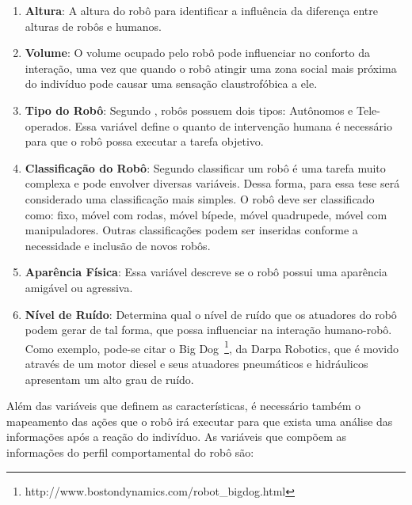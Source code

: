 \begin{enumerate}
	\item \textbf{Altura}: A altura do robô para identificar a influência da diferença entre alturas de robôs e humanos.
	\item \textbf{Volume}: O volume ocupado pelo robô pode influenciar no conforto da interação, uma vez que quando o robô atingir uma zona social mais próxima do indivíduo pode causar uma sensação claustrofóbica a ele.
	\item \textbf{Tipo do Robô}: Segundo , robôs possuem dois tipos: Autônomos e Tele-operados. Essa variável define o quanto de intervenção humana é necessário para que o robô possa executar a tarefa objetivo.
	\item \textbf{Classificação do Robô}: Segundo  classificar um robô é uma tarefa muito complexa e pode envolver diversas variáveis. Dessa forma, para essa tese será considerado uma classificação mais simples. O robô deve ser classificado como: fixo, móvel com rodas, móvel bípede, móvel quadrupede, móvel com manipuladores. Outras classificações podem ser inseridas conforme a necessidade e inclusão de novos robôs.
	\item \textbf{Aparência Física}: Essa variável descreve se o robô possui uma aparência amigável ou agressiva.
	\item \textbf{Nível de Ruído}: Determina qual o nível de ruído que os atuadores do robô podem gerar de tal forma, que possa influenciar na interação humano-robô. Como exemplo, pode-se citar o Big Dog~\footnote{http://www.bostondynamics.com/robot\_bigdog.html}, da Darpa Robotics, que é movido através de um motor diesel e seus atuadores pneumáticos e hidráulicos apresentam um alto grau de ruído.
\end{enumerate}

Além das variáveis que definem as características, é necessário também o mapeamento das ações que o robô irá executar para que exista uma análise das informações após a reação do indivíduo. As variáveis que compõem as informações do perfil comportamental do robô são:

